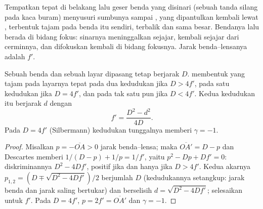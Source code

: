 \begin{method}[Autokolimasi]\label{met:b1:mirrors-thin-lenses:autocollimation}
Tempatkan  tepat di belakang  lalu geser benda yang
disinari (sebuah tanda silang pada kaca buram) menyusuri sumbunya sampai
, yang dipantulkan kembali lewat , terbentuk tajam
pada benda itu sendiri, terbalik dan sama besar. Bendanya lalu berada
di bidang fokus: sinarnya meninggalkan  sejajar, kembali sejajar
dari cerminnya, dan difokuskan kembali di bidang fokusnya. Jarak
benda--lensanya adalah $f'$.
\end{method}

\begin{proposition}\label{prop:b1:mirrors-thin-lenses:bessel}
Sebuah benda dan sebuah layar dipasang tetap berjarak $D$.  membentuk  yang tajam pada layarnya tepat pada
dua kedudukan jika $D > 4f'$, pada satu kedudukan jika $D = 4f'$, dan
pada tak satu pun jika $D < 4f'$. Kedua kedudukan itu berjarak $d$
dengan
\[
f' = \frac{D^2 - d^2}{4D} .
\]
Pada $D = 4f'$ (Silbermann) kedudukan tunggalnya memberi $\gamma = -1$.
\end{proposition}

\begin{proof}
Misalkan $p = -\overline{OA} > 0$ jarak benda--lensa; maka
$\overline{OA'} = D - p$ dan Descartes memberi $1/(D - p) + 1/p = 1/f'$,
yaitu $p^2 - Dp + Df' = 0$: diskriminannya $D^2 - 4Df'$, positif jika
dan hanya jika $D > 4f'$. Kedua akarnya $p_{1,2} = (D \mp \sqrt{D^2 - 4Df'})/2$
berjumlah $D$ (kedudukannya setangkup: jarak benda dan jarak 
saling bertukar) dan berselisih $d = \sqrt{D^2 - 4Df'}$; selesaikan
untuk $f'$. Pada $D = 4f'$, $p = 2f' = \overline{OA'}$ dan $\gamma = -1$.
\end{proof}

